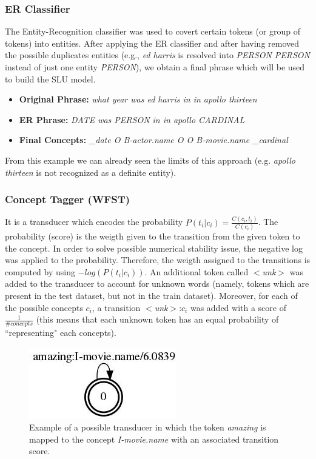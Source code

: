 \documentclass[11pt,a4paper]{article}
\begin{document}
\subsubsection{ER Classifier}

The Entity-Recognition classifier was used to covert certain tokens (or group of tokens) into entities. After applying the ER classifier and after having removed the possible duplicates entities (e.g., \textit{ed harris} is resolved into \textit{PERSON PERSON} instead of just one entity \textit{PERSON}), we obtain a final phrase which will be used to build the SLU model.
\begin{itemize}
\item \textbf{Original Phrase:} \textit{what year was ed harris in in apollo thirteen}
\item \textbf{ER Phrase:} \textit{DATE was PERSON in in apollo CARDINAL}
\item \textbf{Final Concepts:} \textit{\_date O B-actor.name O O B-movie.name \_cardinal}
\end{itemize}

From this example we can already seen the limits of this approach (e.g. \textit{apollo thirteen} is not recognized as a definite entity). 

\subsubsection{Concept Tagger (WFST)}
It is a transducer which encodes the probability $P(t_i|c_i) = \frac{C(c_i, t_i)}{C(c_i)}$. The probability (score) is the weigth given to the transition from the given token to the concept. In order to solve possible numerical stability issue, the negative log was applied to the probability. Therefore, the weigth assigned to the transitions is computed by using $-log(P(t_i|c_i))$. An additional token called $<$\textit{unk}$>$ was added to the transducer to account for unknown words (namely, tokens which are present in the test dataset, but not in the train dataset). Moreover, for each of the possible concepts $c_i$, a transition $<$\textit{unk}$>$:$c_i$ was added with a score of $\frac{1}{\#concepts}$ (this means that each unknown token has an equal probability of ``representing" each concepts). 
\begin{figure}[b!]
	\centering
	\includegraphics[width=0.5\linewidth]{img/pos-tagger}
	\caption{Example of a possible transducer in which the token \textit{amazing} is mapped to the concept \textit{I-movie.name} with an associated transition score.}
\end{figure}
\end{document}
